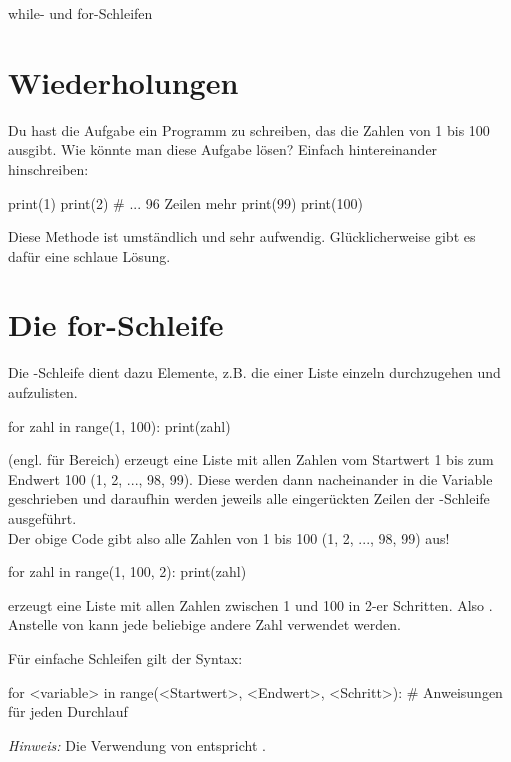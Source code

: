 \documentclass{\VorlagenPfad/coderdojokatext}
\newcommand{\Titel}{while- und for-Schleifen}
\begin{document}
\setcounter{chapter}{2}

\begin{center}
	{\huge \Titel}
\end{center}

\section{Wiederholungen} Du hast die Aufgabe ein Programm zu schreiben, das die Zahlen von 1 bis 100 ausgibt. Wie könnte man diese Aufgabe lösen? Einfach hintereinander hinschreiben:

\begin{pythoncode}
print(1)
print(2)
# ... 96 Zeilen mehr
print(99)
print(100)
\end{pythoncode}

Diese Methode ist umständlich und sehr aufwendig. Glücklicherweise gibt es dafür eine schlaue Lösung.

\section{Die for-Schleife} Die -Schleife dient dazu Elemente, z.B. die einer Liste einzeln durchzugehen und aufzulisten.

\begin{pythoncode}
for zahl in range(1, 100):
	print(zahl)
\end{pythoncode}

 (engl. für Bereich) erzeugt eine Liste mit allen Zahlen vom Startwert 1 bis zum Endwert 100 (1, 2, ..., 98, 99). Diese werden dann nacheinander in die Variable  geschrieben und daraufhin werden jeweils alle eingerückten Zeilen der -Schleife ausgeführt.\\
Der obige Code gibt also alle Zahlen von 1 bis 100 (1, 2, ..., 98, 99) aus!

\begin{pythoncode}
for zahl in range(1, 100, 2):
	print(zahl)
\end{pythoncode}
 erzeugt eine Liste mit allen Zahlen zwischen 1 und 100 in 2-er Schritten. Also . Anstelle von  kann jede beliebige andere Zahl verwendet werden.

\begin{merkbox}
Für einfache Schleifen gilt der Syntax:
\begin{pythoncode}
for <variable> in range(<Startwert>, <Endwert>, <Schritt>):
	# Anweisungen für jeden Durchlauf
\end{pythoncode}
\emph{Hinweis:} Die Verwendung von  entspricht .
\end{merkbox}
\end{document}
